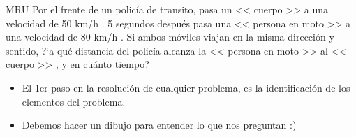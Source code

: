 \documentclass{beamer}
\begin{document}
\begin{frame}{MRU}
Por el frente de un polic{\'i}a de transito, 
pasa un << cuerpo >> a una velocidad de { 50 km/h }. 
{ 5 segundos } despu\'es pasa una << persona en moto >> a una 
velocidad de { 80 km/h }. Si ambos m\'oviles viajan en la 
misma direcci\'on y sentido, ?`a qu\'e distancia del polic{\'i}a 
alcanza la << persona en moto >> al << cuerpo >> , 
y en cu\'anto tiempo?

\begin{itemize}
\item El 1er paso en la resoluci\'on de cualquier problema, es la
identificaci\'on de los elementos del problema.
\item Debemos hacer un dibujo para entender lo que nos preguntan :)
\end{itemize}
\end{frame}
\end{document}
